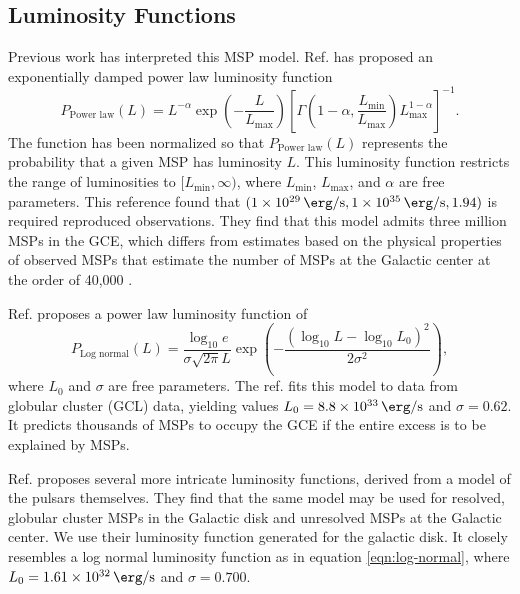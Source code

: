 \documentclass[a4paper,11pt]{article}
\newcommand{\parens}[1]{\left(#1\right)}
\newcommand{\brackets}[1]{\left[#1\right]}
\newcommand{\expp}[1]{\exp \parens{#1}}
\newcommand{\comment}[1]{\emph{\color{red}{#1}}}
\begin{document}
\subsection{Luminosity Functions}
\label{sec:lum-funcs}
Previous work has interpreted this MSP model. Ref. \cite{Zhong:2019ycb} has proposed an exponentially damped power law luminosity function
\begin{equation}
    P_\text{Power law}(L) = L^{-\alpha} \expp{-\frac{L}{L_\text{max}}}\brackets{\Gamma\parens{1-\alpha, \frac{L_\text{min}}{L_\text{max}}}L_\text{max}^{1-\alpha}}^{-1}.
    \label{eqn:power-law}
\end{equation}
The function has been normalized so that $P_\text{Power law}(L)$ represents the probability that a given MSP has luminosity $L$. This luminosity function restricts the range of luminosities to $[L_\text{min}, \infty)$, where $L_\text{min}$, $L_\text{max}$, and $\alpha$ are free parameters. \comment{The following should probably be moved to the introduction, where Fermilab's research is described.} This reference found that $(\SI{1e29}{\erg\per\second}, \SI{1e35}{\erg\per\second}, 1.94)$ is required reproduced observations. They find that this model admits three million MSPs in the GCE, which differs from estimates based on the physical properties of observed MSPs that estimate the number of MSPs at the Galactic center at the order of 40,000 \cite{citation_needed}.

Ref. \cite{osti_1305131} proposes a power law luminosity function of
\begin{equation}
    P_\text{Log normal}(L)= \frac{\log_{10} e}{\sigma \sqrt{2\pi} L}\expp{-\frac{\parens{\log_{10} L - \log_{10} L_0}^2}{2\sigma^2}},
    \label{eqn:log-normal}
\end{equation}
where $L_0$ and $\sigma$ are free parameters. The ref. fits this model to data from globular cluster (GCL) data, yielding values $L_0 = \SI{8.8e33}{\erg\per\second}$ and $\sigma=0.62$. It predicts thousands of MSPs to occupy the GCE if the entire excess is to be explained by MSPs.

Ref. \cite{Ploeg:2020jeh} proposes several more intricate luminosity functions, derived from a model of the pulsars themselves. They find that the same model may be used for resolved, globular cluster MSPs in the Galactic disk and unresolved MSPs at the Galactic center. We use their luminosity function generated for the galactic disk. It closely resembles a log normal luminosity function as in equation \ref{eqn:log-normal}, where $L_0 = \SI{1.61e+32}{\erg\per\second}$ and $\sigma=0.700$.
\end{document}
